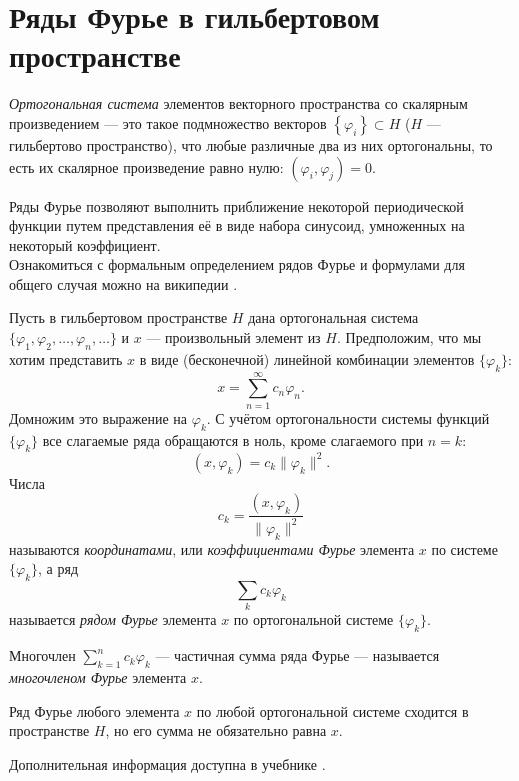 \section{Ряды Фурье в гильбертовом пространстве}
\label{sec:q-24}
\textit{Ортогональная система} элементов векторного пространства со скалярным произведением --- это такое подмножество векторов $\left\{ \varphi_i \right\}\subset H$ ($H$ --- гильбертово пространство), что любые различные два из них ортогональны, то есть их скалярное произведение равно нулю: $(\varphi_i, \varphi_j) = 0$.

Ряды Фурье позволяют выполнить приближение некоторой периодической функции путем представления её в виде набора синусоид, умноженных на некоторый коэффициент.\\
Ознакомиться с формальным определением рядов Фурье и формулами для общего случая можно на википедии \cite{fourier-series}.

Пусть в гильбертовом пространстве $H$ дана ортогональная система $\allowbreak \{\varphi_1, \varphi_2,\allowbreak\dots, \varphi_n, \dots\}$ и $x$ --- произвольный элемент из $H$. Предположим, что мы хотим представить $x$ в виде (бесконечной) линейной комбинации элементов $\{\varphi_k\}$: 
$$x = \sum^{\infty}_{n=1}c_n\varphi_n.$$
Домножим это выражение на $\varphi_k$. С учётом ортогональности системы функций $\{\varphi_k\}$ все слагаемые ряда обращаются в ноль, кроме слагаемого при $n=k$:
$$(x, \varphi_k) = c_k\|\varphi_k\|^2.$$
Числа 
$$c_k =\frac{(x, \varphi_k)}{\|\varphi_k\|^2}$$
называются \textit{координатами}, или \textit{коэффициентами Фурье} элемента $x$ по системе $\{\varphi_k\}$, а ряд
$$\sum_k c_k \varphi_k$$
называется \textit{рядом Фурье} элемента $x$ по ортогональной системе $\{\varphi_k\}$.

Многочлен $\displaystyle \sum_{k=1}^{n}c_k\varphi_k$ --- частичная сумма ряда Фурье --- называется \textit{многочленом Фурье} элемента $x$.

Ряд Фурье любого элемента $x$ по любой ортогональной системе сходится в пространстве $H$, но его сумма не обязательно равна $x$.

Дополнительная информация доступна в учебнике \cite[с.~54]{trenogin}.